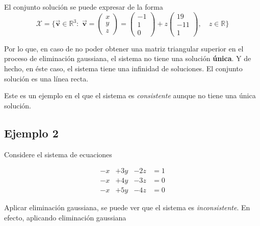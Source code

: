 \documentclass[
]{article}
\begin{document}
El conjunto solución se puede expresar de la forma \[
\mathcal{X}= \Bigg\{\vec{\mathbf{v}}\in\mathbb{R}^{3}:\,\,
                    \vec{\mathbf{v}}=\begin{pmatrix}
                                          x \\ y \\z
                                      \end{pmatrix} = \begin{pmatrix}
                                                        -1 \\ 1 \\0
                                                        \end{pmatrix} + z 
                                                        \begin{pmatrix}
                                                          19 \\ -11 \\1
                                                        \end{pmatrix}, \quad z\in\mathbb{R}    
              \Bigg\}
\]

Por lo que, en caso de no poder obtener una matriz triangular superior
en el proceso de eliminación gaussiana, el sistema no tiene una solución
\textbf{única}. Y de hecho, en éste caso, el sistema tiene una infinidad
de soluciones. El conjunto solución es una línea recta.

Este es un ejemplo en el que el sistema es \emph{consistente} aunque no
tiene una única solución.

\hypertarget{ejemplo-2}{%
\subsection{Ejemplo 2}\label{ejemplo-2}}

Considere el sistema de ecuaciones

\begin{equation*}
  \begin{matrix}
           -x  & +3 y  & -2z & = 1  \\
           -x & +4 y  & -3z & = 0   \\
           -x & +5 y  & -4z  & = 0
  \end{matrix}
\end{equation*}

Aplicar eliminación gaussiana, se puede ver que el sistema es
\emph{inconsistente}. En efecto, aplicando eliminación gaussiana
\end{document}
